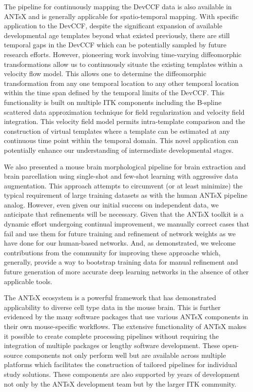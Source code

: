 \documentclass[
  12pt,
]{article}
\begin{document}
The pipeline for continuously mapping the DevCCF data is also available
in ANTsX and is generally applicable for spatio-temporal mapping. With
specific application to the DevCCF, despite the significant expansion of
available developmental age templates beyond what existed previously,
there are still temporal gaps in the DevCCF which can be potentially
sampled by future research efforts. However, pioneering work involving
time-varying diffeomorphic transformations allow us to continuously
situate the existing templates within a velocity flow model. This allows
one to determine the diffeomorphic transformation from any one temporal
location to any other temporal location within the time span defined by
the temporal limits of the DevCCF. This functionality is built on
multiple ITK components including the B-spline scattered data
approximation technique for field regularization and velocity field
integration. This velocity field model permits intra-template comparison
and the construction of virtual templates where a template can be
estimated at any continuous time point within the temporal domain. This
novel application can potentially enhance our understanding of
intermediate developmental stages.

We also presented a mouse brain morphological pipeline for brain
extraction and brain parcellation using single-shot and few-shot
learning with aggressive data augmentation. This approach attempts to
circumvent (or at least minimize) the typical requirement of large
training datasets as with the human ANTsX pipeline analog. However, even
given our initial success on independent data, we anticipate that
refinements will be necessary. Given that the ANTsX toolkit is a dynamic
effort undergoing continual improvement, we manually correct cases that
fail and use them for future training and refinement of network weights
as we have done for our human-based networks. And, as demonstrated, we
welcome contributions from the community for improving these approache
which, generally, provide a way to bootstrap training data for manual
refinement and future generation of more accurate deep learning networks
in the absence of other applicable tools.

The ANTsX ecosystem is a powerful framework that has demonstrated
applicability to diverse cell type data in the mouse brain. This is
further evidenced by the many software packages that use various ANTsX
components in their own mouse-specific workflows. The extensive
functionality of ANTsX makes it possible to create complete processing
pipelines without requiring the integration of multiple packages or
lengthy software development. These open-source components not only
perform well but are available across multiple platforms which
facilitates the construction of tailored pipelines for individual study
solutions. These components are also supported by years of development
not only by the ANTsX development team but by the larger ITK community.
\end{document}
